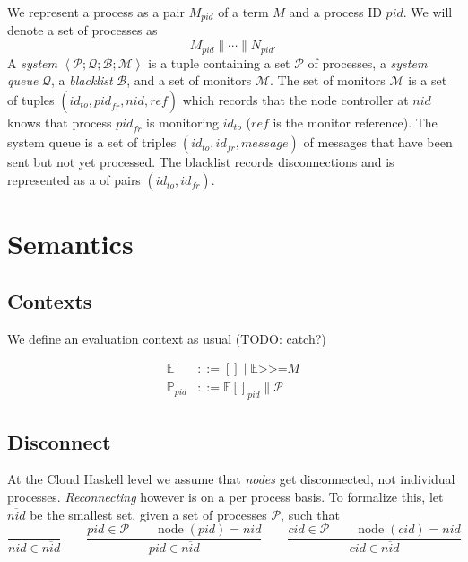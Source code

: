 \documentclass{article}
\newcommand{\sBind}[2]{{#1} \mathrel{\texttt{>}\!\!\texttt{>}\!\texttt{=}} {#2}}
\DeclareMathOperator{\sNodeOf}{node}
\newcommand{\sPar}{\mathrel{\parallel}}
\newcommand{\sProc}[2]{{#1}_{#2}}
\newcommand{\sNid}{\ensuremath{\mathit{nid}}}
\newcommand{\sPid}{\ensuremath{\mathit{pid}}}
\newcommand{\sCid}{\ensuremath{\mathit{cid}}}
\newcommand{\sId}{\ensuremath{\mathit{id}}}
\newcommand{\sRef}{\ensuremath{\mathit{ref}}}
\newcommand{\sSystem}[4]{\left\langle #1 ; #2 ; #3 ; #4 \right\rangle}
\newcommand{\sQueue}{\mathcal{Q}}
\newcommand{\sProcesses}{\mathcal{P}}
\newcommand{\sBlacklist}{\mathcal{B}}
\newcommand{\sMonitors}{\mathcal{M}}
\newcommand{\sCtxt}[1]{\mathbb{#1}}
\newcommand{\OR}{\mathrel{|}}
\begin{document}
We represent a process as a pair $\sProc{M}{\sPid}$ of a term $M$ and a process
ID $\sPid$. We will denote a set of processes as
%
  $$\sProc{M}{\sPid} \sPar \cdots \sPar \sProc{N}{\sPid'}$$
%
A \emph{system} 
  $\sSystem{\sProcesses}{\sQueue}{\sBlacklist}{\sMonitors}$ 
is a tuple containing a set $\sProcesses$ of processes, a \emph{system
queue} $\sQueue$, a \emph{blacklist} $\sBlacklist$, and a set of monitors
$\sMonitors$.
The set of monitors $\sMonitors$ is a set of tuples 
  $(\sId_\mathit{to}, \sPid_\mathit{fr}, \sNid, \sRef)$ 
which records that the node controller at \sNid{} knows that process
$\sPid_\mathit{fr}$ is monitoring $\sId_\mathit{to}$ ($\sRef$ is the monitor
reference).
The system queue is a set of triples $(\sId_\mathit{to}, \sId_\mathit{fr},
\mathit{message})$ of messages that have been sent but not yet processed. The
blacklist records disconnections and is represented as a of pairs
$(\sId_\mathit{to}, \sId_\mathit{fr})$. 


\section{Semantics}

\subsection{Contexts}

We define an evaluation context as usual (TODO: catch?)

\begin{align*}
\sCtxt{E} & ::= [] \OR \sBind{\sCtxt{E}}{M}  \\
\sCtxt{P}_\sPid  & ::= \sCtxt{E}[]_\sPid \sPar \sProcesses
\end{align*}

\subsection{Disconnect}

At the Cloud Haskell level we assume that \emph{nodes} get disconnected, not
individual processes. \emph{Reconnecting} however is on a per process basis. To
formalize this, let $\overline{\sNid}$ be the smallest set, given a set of
processes $\sProcesses$, such that
%
\begin{equation*}
\frac{
}{
\sNid \in \overline{\sNid}
} 
%
\qquad
%
\frac{
\sPid \in \sProcesses \qquad
\sNodeOf(\sPid) = \sNid
}{
\sPid \in \overline{\sNid}
}
%
\qquad
%
\frac{
\sCid \in \sProcesses \qquad
\sNodeOf(\sCid) = \sNid
}{
\sCid \in \overline{\sNid}
}
\end{equation*}
\end{document}
